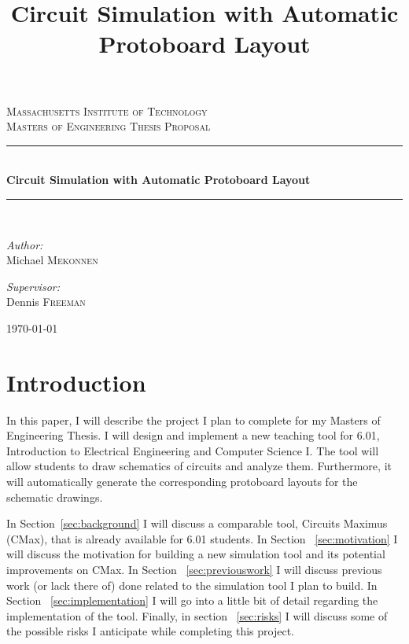 \documentclass[12pt, doublespacing]{amsart}
\title{Circuit Simulation with Automatic Protoboard Layout}
\newcommand{\HRule}{\rule{\linewidth}{0.5mm}}
\begin{document}
\begin{titlepage}
\begin{center}

\textsc{\LARGE Massachusetts Institute of Technology}\\[1.5cm]

\textsc{\Large Masters of Engineering Thesis Proposal}\\[0.5cm]

\HRule \\[0.4cm]
{ \huge \bfseries Circuit Simulation with Automatic Protoboard Layout}\\[0.4cm]
\HRule \\[1.5cm]

\begin{minipage}{0.4\textwidth}
\begin{flushleft} \large
\emph{Author:} \\
Michael \textsc{Mekonnen}
\end{flushleft}
\end{minipage}
\begin{minipage}{0.4\textwidth}
\begin{flushright} \large
\emph{Supervisor:} \\
Dennis \textsc{Freeman}
\end{flushright}
\end{minipage}

\vfill

{\large \today}

\end{center}
\end{titlepage}

\maketitle

\section{Introduction}

In this paper, I will describe the project I plan to complete for my Masters of Engineering Thesis. I will design and implement a new teaching tool for 6.01, Introduction to Electrical Engineering and Computer Science I. The tool will allow students to draw schematics of circuits and analyze them. Furthermore, it will automatically generate the corresponding protoboard layouts for the schematic drawings.

In Section~\ref{sec:background} I will discuss a comparable tool, Circuits Maximus (CMax), that is already available for 6.01 students. In Section ~\ref{sec:motivation} I will discuss the motivation for building a new simulation tool and its potential improvements on CMax. In Section ~\ref{sec:previouswork} I will discuss previous work (or lack there of) done related to the  simulation tool I plan to build. In Section ~\ref{sec:implementation} I will go into a little bit of detail regarding the implementation of the tool. Finally, in section ~\ref{sec:risks} I will discuss some of the possible risks I anticipate while completing this project.
\end{document}

